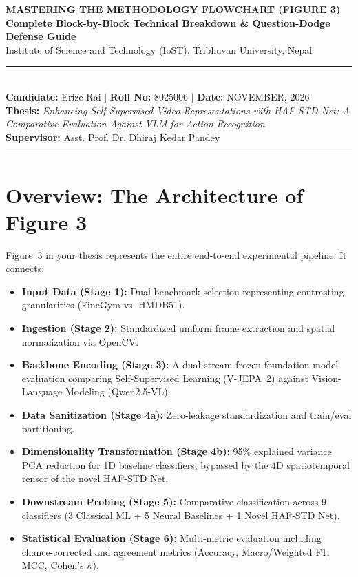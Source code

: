 \documentclass[a4paper, 11pt]{article}
\begin{document}
\begin{center}
  {\fontsize{17}{21}\selectfont \textbf{\color{primaryblue}MASTERING THE METHODOLOGY FLOWCHART (FIGURE 3)}}\\[3pt]
  {\fontsize{12}{15}\selectfont \textbf{\color{accentdark}Complete Block-by-Block Technical Breakdown \& Question-Dodge Defense Guide}}\\[3pt]
  {\fontsize{10}{13}\selectfont Institute of Science and Technology (IoST), Tribhuvan University, Nepal}\\[4pt]
  \rule{\textwidth}{1.2pt}\\[4pt]
  \textbf{Candidate:} Erize Rai \quad$|$ \quad \textbf{Roll No:} 8025006 \quad$|$ \quad \textbf{Date:} NOVEMBER, 2026\\
  \textbf{Thesis:} \textit{Enhancing Self-Supervised Video Representations with HAF-STD Net: A Comparative Evaluation Against VLM for Action Recognition}\\
  \textbf{Supervisor:} Asst. Prof. Dr. Dhiraj Kedar Pandey\\
  \rule{\textwidth}{0.6pt}
\end{center}

\vspace{0.2cm}
\tableofcontents
\newpage

\section{Overview: The Architecture of Figure 3}

Figure~3 in your thesis represents the entire end-to-end experimental pipeline. It connects:
\begin{itemize}
    \item \textbf{Input Data (Stage 1):} Dual benchmark selection representing contrasting granularities (FineGym vs. HMDB51).
    \item \textbf{Ingestion (Stage 2):} Standardized uniform frame extraction and spatial normalization via OpenCV.
    \item \textbf{Backbone Encoding (Stage 3):} A dual-stream frozen foundation model evaluation comparing Self-Supervised Learning (V-JEPA~2) against Vision-Language Modeling (Qwen2.5-VL).
    \item \textbf{Data Sanitization (Stage 4a):} Zero-leakage standardization and train/eval partitioning.
    \item \textbf{Dimensionality Transformation (Stage 4b):} 95\% explained variance PCA reduction for 1D baseline classifiers, bypassed by the 4D spatiotemporal tensor of the novel HAF-STD Net.
    \item \textbf{Downstream Probing (Stage 5):} Comparative classification across 9 classifiers (3 Classical ML + 5 Neural Baselines + 1 Novel HAF-STD Net).
    \item \textbf{Statistical Evaluation (Stage 6):} Multi-metric evaluation including chance-corrected and agreement metrics (Accuracy, Macro/Weighted F1, MCC, Cohen's $\kappa$).
\end{itemize}
\end{document}

